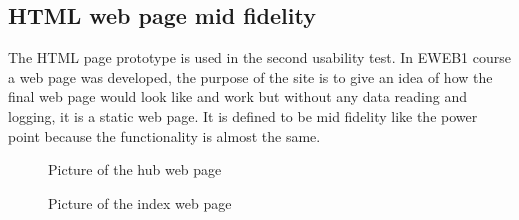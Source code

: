 \subsection{HTML web page mid fidelity}
The HTML page prototype is used in the second usability test.  In EWEB1 course a web page was developed, the purpose of the site is to give an idea of how the final web page would look like and work but without any data reading and logging, it is a static web page. It is defined to be mid fidelity like the power point because the functionality is almost the same.
\begin{figure}[H]
	\center
		\setlength\fboxsep{0pt}
		\setlength\fboxrule{1pt}
   	\caption{Picture of the hub web page}
   	\label{fig:web_hub_interface}
\end{figure}
\begin{figure}[H]
	\center
		\setlength\fboxsep{0pt}
		\setlength\fboxrule{1pt}
   	\caption{Picture of the index web page}
   	\label{fig:web_index_interface}
\end{figure}
